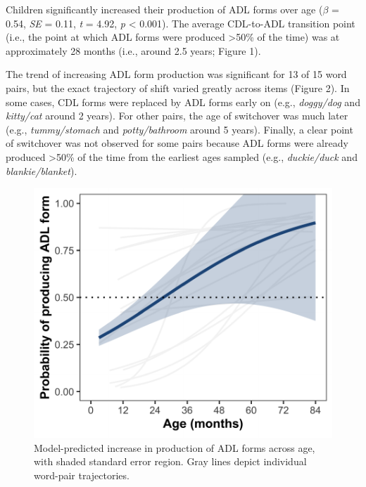 \documentclass[10pt, letterpaper]{article}
\newenvironment{CodeChunk}{}{}
\begin{document}
Children significantly increased their production of ADL forms over age
(\(\beta\) = 0.54, \emph{SE} = 0.11, \emph{t} = 4.92, \emph{p}
\textless{} 0.001). The average CDL-to-ADL transition point (i.e., the
point at which ADL forms were produced \textgreater50\% of the time) was
at approximately 28 months (i.e., around 2.5 years; Figure 1).

The trend of increasing ADL form production was significant for 13 of 15
word pairs, but the exact trajectory of shift varied greatly across
items (Figure 2). In some cases, CDL forms were replaced by ADL forms
early on (e.g., \emph{doggy/dog} and \emph{kitty/cat} around 2 years).
For other pairs, the age of switchover was much later (e.g.,
\emph{tummy/stomach} and \emph{potty/bathroom} around 5 years). Finally,
a clear point of switchover was not observed for some pairs because ADL
forms were already produced \textgreater50\% of the time from the
earliest ages sampled (e.g., \emph{duckie/duck} and
\emph{blankie/blanket}).

\begin{CodeChunk}
\begin{figure}[h]

\includegraphics{figs/shift-timing-fig-1} \hfill{}

\caption[Model-predicted increase in production of ADL forms across age, with shaded standard error region]{Model-predicted increase in production of ADL forms across age, with shaded standard error region. Gray lines depict individual word-pair trajectories.}\label{fig:shift-timing-fig}
\end{figure}
\end{CodeChunk}
\end{document}
